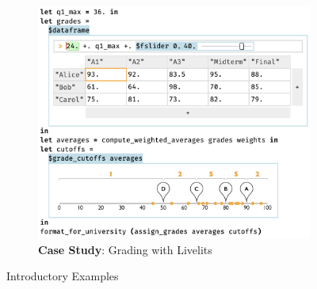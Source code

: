 \begin{figure}
\begin{minipage}[t]{0.37\textwidth}
\begin{subfigure}[t]{\linewidth}
    \end{subfigure}
  \end{minipage}
  \hspace{10.5mm}
  \begin{subfigure}[t]{0.50\textwidth}
  \begin{snugshade}
   \vspace*{-2mm}
    \caption{\textbf{Case Study}: Grading with Livelits}
    \label{fig:grading}
    \vspace*{1mm}
     \end{snugshade}
    \vspace*{-1mm}
    \includegraphics[width=\linewidth]{grade-cutoff-livelit.png}
  \end{subfigure}
  \vspace{-4mm}
   \caption{Introductory Examples}
\end{figure}

